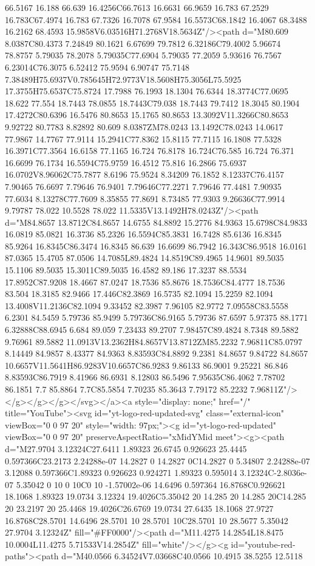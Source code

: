 {{{{{66.5167 16.188 66.639 16.4256C66.7613 16.6631 66.9659 16.783 67.2529 16.783C67.4974 16.783 67.7326 16.7078 67.9584 16.5573C68.1842 16.4067 68.3488 16.2162 68.4593 15.9858V6.03516H71.2768V18.5634Z"/><path d="M80.609 8.0387C80.4373 7.24849 80.1621 6.67699 79.7812 6.32186C79.4002 5.96674 78.8757 5.79035 78.2078 5.79035C77.6904 5.79035 77.2059 5.93616 76.7567 6.23014C76.3075 6.52412 75.9594 6.90747 75.7148 7.38489H75.6937V0.785645H72.9773V18.5608H75.3056L75.5925 17.3755H75.6537C75.8724 17.7988 76.1993 18.1304 76.6344 18.3774C77.0695 18.622 77.554 18.7443 78.0855 18.7443C79.038 18.7443 79.7412 18.3045 80.1904 17.4272C80.6396 16.5476 80.8653 15.1765 80.8653 13.3092V11.3266C80.8653 9.92722 80.7783 8.82892 80.609 8.0387ZM78.0243 13.1492C78.0243 14.0617 77.9867 14.7767 77.9114 15.2941C77.8362 15.8115 77.7115 16.1808 77.5328 16.3971C77.3564 16.6158 77.1165 16.724 76.8178 16.724C76.585 16.724 76.371 16.6699 76.1734 16.5594C75.9759 16.4512 75.816 16.2866 75.6937 16.0702V8.96062C75.7877 8.6196 75.9524 8.34209 76.1852 8.12337C76.4157 7.90465 76.6697 7.79646 76.9401 7.79646C77.2271 7.79646 77.4481 7.90935 77.6034 8.13278C77.7609 8.35855 77.8691 8.73485 77.9303 9.26636C77.9914 9.79787 78.022 10.5528 78.022 11.5335V13.1492H78.0243Z"/><path d="M84.8657 13.8712C84.8657 14.6755 84.8892 15.2776 84.9363 15.6798C84.9833 16.0819 85.0821 16.3736 85.2326 16.5594C85.3831 16.7428 85.6136 16.8345 85.9264 16.8345C86.3474 16.8345 86.639 16.6699 86.7942 16.343C86.9518 16.0161 87.0365 15.4705 87.0506 14.7085L89.4824 14.8519C89.4965 14.9601 89.5035 15.1106 89.5035 15.3011C89.5035 16.4582 89.186 17.3237 88.5534 17.8952C87.9208 18.4667 87.0247 18.7536 85.8676 18.7536C84.4777 18.7536 83.504 18.3185 82.9466 17.446C82.3869 16.5735 82.1094 15.2259 82.1094 13.4008V11.2136C82.1094 9.33452 82.3987 7.96105 82.9772 7.09558C83.5558 6.2301 84.5459 5.79736 85.9499 5.79736C86.9165 5.79736 87.6597 5.97375 88.1771 6.32888C88.6945 6.684 89.059 7.23433 89.2707 7.98457C89.4824 8.7348 89.5882 9.76961 89.5882 11.0913V13.2362H84.8657V13.8712ZM85.2232 7.96811C85.0797 8.14449 84.9857 8.43377 84.9363 8.83593C84.8892 9.2381 84.8657 9.84722 84.8657 10.6657V11.5641H86.9283V10.6657C86.9283 9.86133 86.9001 9.25221 86.846 8.83593C86.7919 8.41966 86.6931 8.12803 86.5496 7.95635C86.4062 7.78702 86.1851 7.7 85.8864 7.7C85.5854 7.70235 85.3643 7.79172 85.2232 7.96811Z"/></g></g></g></svg></a><a style="display: none;" href="/" title="YouTube"><svg id="yt-logo-red-updated-svg" class="external-icon" viewBox="0 0 97 20" style="width: 97px;"><g id="yt-logo-red-updated" viewBox="0 0 97 20" preserveAspectRatio="xMidYMid meet"><g><path d="M27.9704 3.12324C27.6411 1.89323 26.6745 0.926623 25.4445 0.597366C23.2173 2.24288e-07 14.2827 0 14.2827 0C14.2827 0 5.34807 2.24288e-07 3.12088 0.597366C1.89323 0.926623 0.924271 1.89323 0.595014 3.12324C-2.8036e-07 5.35042 0 10 0 10C0 10 -1.57002e-06 14.6496 0.597364 16.8768C0.926621 18.1068 1.89323 19.0734 3.12324 19.4026C5.35042 20 14.285 20 14.285 20C14.285 20 23.2197 20 25.4468 19.4026C26.6769 19.0734 27.6435 18.1068 27.9727 16.8768C28.5701 14.6496 28.5701 10 28.5701 10C28.5701 10 28.5677 5.35042 27.9704 3.12324Z" fill="#FF0000"/><path d="M11.4275 14.2854L18.8475 10.0004L11.4275 5.71533V14.2854Z" fill="white"/></g><g id="youtube-red-paths"><path d="M40.0566 6.34524V7.03668C40.0566 10.4915 38.5255 12.5118 }}}}}
